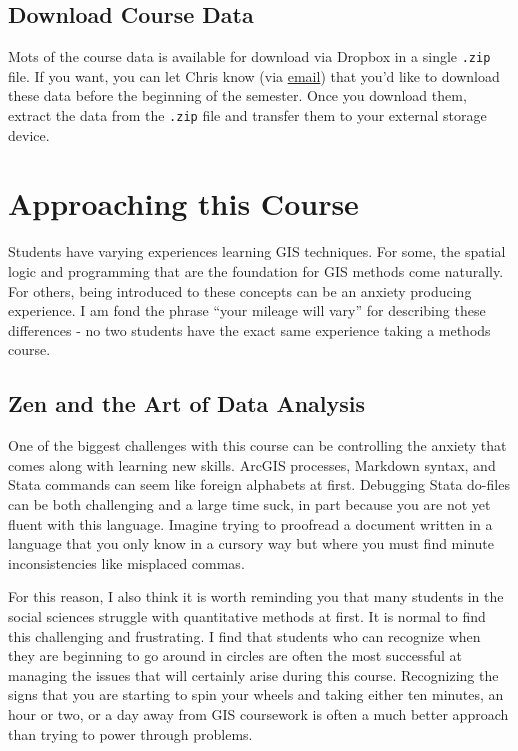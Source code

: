 \documentclass[]{book}
\begin{document}
\section{Download Course Data}\label{download-course-data}

Mots of the course data is available for download via Dropbox in a
single \texttt{.zip} file. If you want, you can let Chris know (via
\href{mailto:prenercg@slu.edu}{email}) that you'd like to download these
data before the beginning of the semester. Once you download them,
extract the data from the \texttt{.zip} file and transfer them to your
external storage device.

\chapter{Approaching this Course}\label{approaching-this-course}

Students have varying experiences learning GIS techniques. For some, the
spatial logic and programming that are the foundation for GIS methods
come naturally. For others, being introduced to these concepts can be an
anxiety producing experience. I am fond the phrase ``your mileage will
vary'' for describing these differences - no two students have the exact
same experience taking a methods course.

\section{Zen and the Art of Data
Analysis}\label{zen-and-the-art-of-data-analysis}

One of the biggest challenges with this course can be controlling the
anxiety that comes along with learning new skills. ArcGIS processes,
Markdown syntax, and Stata commands can seem like foreign alphabets at
first. Debugging Stata do-files can be both challenging and a large time
suck, in part because you are not yet fluent with this language. Imagine
trying to proofread a document written in a language that you only know
in a cursory way but where you must find minute inconsistencies like
misplaced commas.

For this reason, I also think it is worth reminding you that many
students in the social sciences struggle with quantitative methods at
first. It is normal to find this challenging and frustrating. I find
that students who can recognize when they are beginning to go around in
circles are often the most successful at managing the issues that will
certainly arise during this course. Recognizing the signs that you are
starting to spin your wheels and taking either ten minutes, an hour or
two, or a day away from GIS coursework is often a much better approach
than trying to power through problems.
\end{document}
